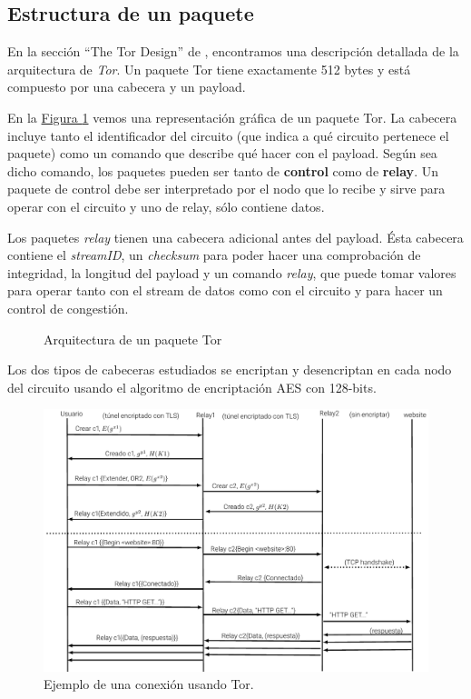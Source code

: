 \documentclass[10pt,a4paper,spanish]{article}
\begin{document}
\subsection{Estructura de un paquete}
En la sección ``The Tor Design'' de \cite{design}, encontramos una descripción detallada de la arquitectura de \textit{Tor}. Un paquete Tor tiene exactamente 512 bytes y está compuesto por una cabecera y un payload. 

En la \hyperref[paquete]{Figura \ref*{paquete}} vemos una representación gráfica de un paquete Tor. La cabecera incluye tanto el identificador del circuito (que indica a qué circuito pertenece el paquete) como un comando que describe qué hacer con el payload. Según sea dicho comando, los paquetes pueden ser tanto de \textbf{control} como de \textbf{relay}. Un paquete de control debe ser interpretado por el nodo que lo recibe y sirve para operar con el circuito y uno de relay, sólo contiene datos.

Los paquetes \textit{relay} tienen una cabecera adicional antes del payload. Ésta cabecera contiene el \textit{streamID}, un \textit{checksum} para poder hacer una comprobación de integridad, la longitud del payload y un comando \textit{relay}, que puede tomar valores para operar tanto con el stream de datos como con el circuito y para hacer un control de congestión.

\begin{figure}[!h]
    \centering
    
    \caption{Arquitectura de un paquete Tor}
    \label{paquete}
\end{figure}

Los dos tipos de cabeceras estudiados se encriptan y desencriptan en cada nodo del circuito usando el algoritmo de encriptación AES con 128-bits.
\begin{figure}[!h]
    \centering
    \includegraphics[width=1\textwidth]{comunicaciones}
    \caption{Ejemplo de una conexión usando Tor.}
    \label{comunicacions}
\end{figure}
\end{document}
